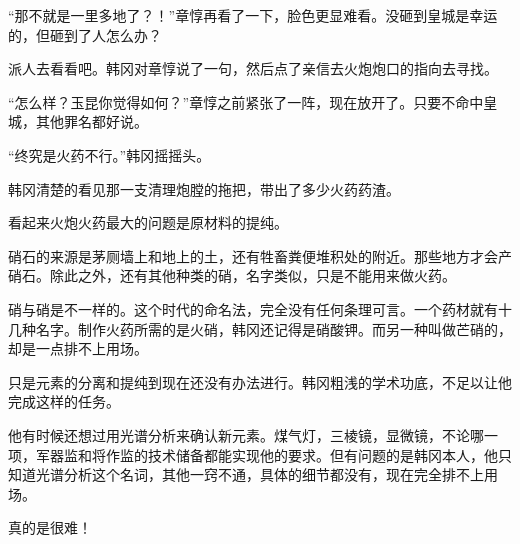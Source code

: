 “那不就是一里多地了？！”章惇再看了一下，脸色更显难看。没砸到皇城是幸运的，但砸到了人怎么办？

派人去看看吧。韩冈对章惇说了一句，然后点了亲信去火炮炮口的指向去寻找。

“怎么样？玉昆你觉得如何？”章惇之前紧张了一阵，现在放开了。只要不命中皇城，其他罪名都好说。

“终究是火药不行。”韩冈摇摇头。

韩冈清楚的看见那一支清理炮膛的拖把，带出了多少火药药渣。

看起来火炮火药最大的问题是原材料的提纯。

硝石的来源是茅厕墙上和地上的土，还有牲畜粪便堆积处的附近。那些地方才会产硝石。除此之外，还有其他种类的硝，名字类似，只是不能用来做火药。

硝与硝是不一样的。这个时代的命名法，完全没有任何条理可言。一个药材就有十几种名字。制作火药所需的是火硝，韩冈还记得是硝酸钾。而另一种叫做芒硝的，却是一点排不上用场。

只是元素的分离和提纯到现在还没有办法进行。韩冈粗浅的学术功底，不足以让他完成这样的任务。

他有时候还想过用光谱分析来确认新元素。煤气灯，三棱镜，显微镜，不论哪一项，军器监和将作监的技术储备都能实现他的要求。但有问题的是韩冈本人，他只知道光谱分析这个名词，其他一窍不通，具体的细节都没有，现在完全排不上用场。

真的是很难！
